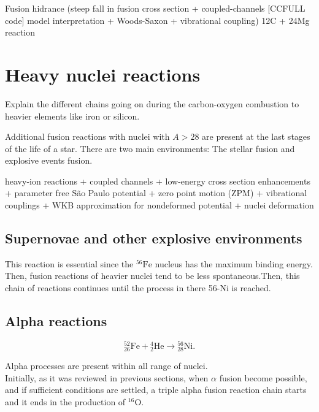 \documentclass[openany]{book}
\begin{document}
Fusion hidrance (steep fall in fusion cross section + coupled-channels [CCFULL code] model interpretation + Woods-Saxon + vibrational coupling) 12C + 24Mg reaction \cite{montagnoli_stefanini_jiang_colucci_goasduff_brugnara_mazzocco_siciliano_scarlassara_corradi_et_2020}


\section{Heavy nuclei reactions } \label{sec:heavyReactions}

Explain the different chains going on during the carbon-oxygen combustion to heavier elements like iron or silicon.

Additional fusion reactions with nuclei with $A > 28$ are present at the last stages of the life of a star. There are two main environments: The stellar fusion and explosive events fusion.

heavy-ion reactions + coupled channels + low-energy cross section enhancements  + parameter free São Paulo potential + zero point motion (ZPM) + vibrational couplings + WKB approximation for nondeformed potential  + nuclei deformation \cite{nobre_chamon_gasques_carlson_thompson_2007}

\subsection{Supernovae and other explosive environments} \label{sub:explosive}

This reaction is essential since the $\mathrm{{}^{56}Fe}$ nucleus has the maximum binding energy. Then, fusion reactions of heavier nuclei tend to be less spontaneous.Then,  this chain of reactions continues until the process in there 56-Ni is reached.

\subsection{Alpha reactions} \label{sub:alphaProcesses}

\begin{equation}  \label{eq:reaction_52Fealpha}
	\mathrm{{}^{52}_{26}Fe +{}^{4}_{2}He \rightarrow {}^{56}_{28}Ni}.
\end{equation}

Alpha processes are present within all range of nuclei. \\

Initially, as it was reviewed in previous sections, when $\alpha$ fusion become possible, and if sufficient conditions are settled, a triple alpha fusion reaction chain starts and it ends in the production of $\mathrm{{}^{16}O}$. 
\end{document}
